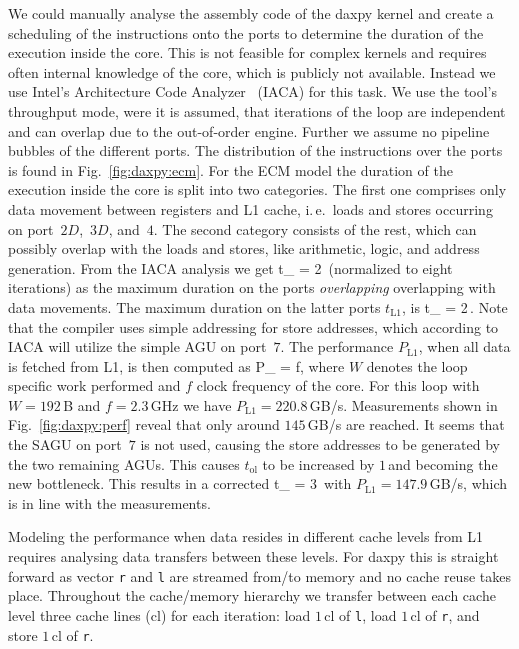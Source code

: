 We could manually analyse the assembly code of the daxpy kernel and create a
scheduling of the instructions onto the ports to determine the duration of the
execution inside the core.
This is not feasible for complex kernels and requires often internal knowledge
of the core, which is publicly not available.
Instead we use Intel's Architecture Code Analyzer~\cite{intel-iaca} (IACA)
for this task. 
We use the tool's throughput mode, were it is assumed, that iterations of the
loop are independent and can overlap due to the out-of-order engine.
Further we assume no pipeline bubbles of the different ports. 
The distribution of the instructions over the ports is found in
{\color{orange} Fig.~\ref{fig:daxpy:ecm}.
For the ECM model the duration of the execution inside the core is split into
two categories.
The first one comprises only data movement between registers and L1 cache,
i.\,e.\ loads and stores occurring on port~$2D$,~$3D$, and~$4$.
The second category consists of the rest, which can possibly overlap with the
loads and stores, like arithmetic, logic, and address generation.}
%
From the IACA analysis we get 
\be
  t_ = 2\,\cyw
\ee
%
(normalized to eight iterations) as the maximum duration on the ports \textit{overlapping} overlapping with data
movements.
The maximum duration on the latter ports $t_\text{L1}$, is
\be
  t_ = 2\,\cyw.
\ee
%
Note that the compiler uses simple addressing for store addresses, which
according to IACA will utilize the simple AGU on port~$7$.
%
%
The performance $P_\text{L1}$, when all data is fetched from L1, is then
computed as 
%
\be
  P_ =  f,
\ee
%
where $W$ denotes the loop specific work performed and $f$ clock
frequency of the core.
For this loop with $W=192$\,B and $f=2.3$\,GHz we have $P_\text{L1} =
220.8$\,GB/s. 
Measurements shown in Fig.~\ref{fig:daxpy:perf} reveal that only around
$145$\,GB/s are reached.
It seems that the SAGU on port~$7$ is not used, causing the store addresses to
be generated by the two remaining AGUs.
This causes $t_\text{ol}$ to be increased by $1$\,\cyw and becoming the new
bottleneck.
This results in a corrected
%
\be
   t_ = 3\,\cyw
\ee
%
with $P_\text{L1} = 147.9$\,GB/s, which is in line with the measurements.


Modeling the performance when data resides in different cache levels from L1
requires analysing data transfers between these levels.
For daxpy this is straight forward as vector \verb'r' and \verb'l' are
streamed from/to memory and no cache reuse takes place.
Throughout the cache/memory hierarchy we transfer between each cache level three 
cache lines (cl) for each iteration: load $1$\,cl of \verb'l', load $1$\,cl of
\verb'r', and store $1$\,cl of \verb'r'.


